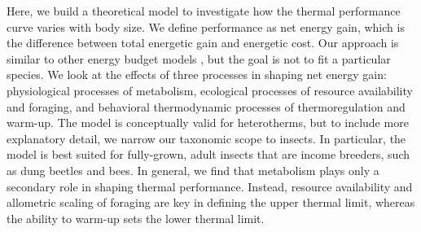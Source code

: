 Here, we build a theoretical model to investigate how the thermal performance curve varies with body size.
We define performance as net energy gain, which is the difference between total energetic gain and energetic cost.
Our approach is similar to other energy budget models \citep[e.g.,][]{Kooijman2009}, but the goal is not to fit a particular species.
We look at the effects of three processes in shaping net energy gain: physiological processes of metabolism, ecological processes of resource availability and foraging, and behavioral thermodynamic processes of thermoregulation and warm-up. %
The model is conceptually valid for heterotherms, but to include more explanatory detail, we narrow our taxonomic scope to insects.
In particular, the model is best suited for fully-grown, adult insects that are income breeders, such as dung beetles and bees.
In general, we find that metabolism plays only a secondary role in shaping thermal performance.
Instead, resource availability and allometric scaling of foraging are key in defining the upper thermal limit, whereas the ability to warm-up sets the lower thermal limit.
